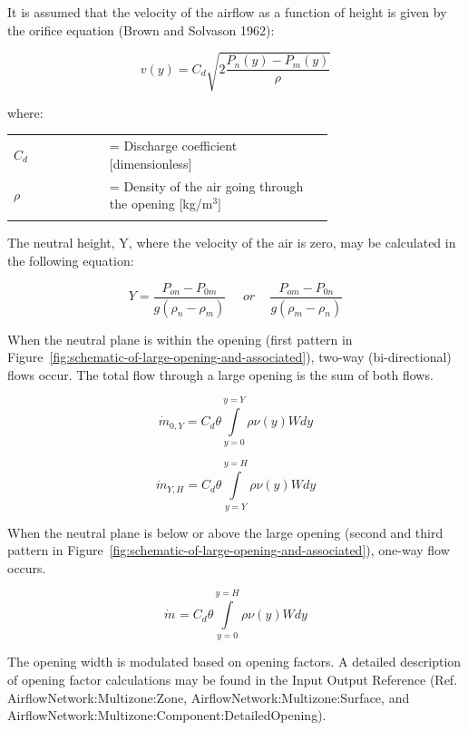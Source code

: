 It is assumed that the velocity of the airflow as a function of height is given by the orifice equation (Brown and Solvason 1962):

\begin{equation}
v(y) = {C_d}\sqrt {2\frac{{{P_n}(y) - {P_m}(y)}}{\rho }}
\end{equation}

where:

\begin{tabular}{lp{0.7\linewidth}}
\\
$C_d$ &= Discharge coefficient [dimensionless] \\
$\rho$ &= Density of the air going through the opening [kg/m\(^{3}\)] \\
\\
\end{tabular}

The neutral height, Y, where the velocity of the air is zero, may be calculated in the following equation:

\begin{equation}
Y = \frac{{{P_{on}} - {P_{0m}}}}{{g({\rho_n} - {\rho_m})}}\,\,\,\,\,\,\,\,or\,\,\,\,\,\,\,\frac{{{P_{om}} - {P_{0n}}}}{{g({\rho_m} - {\rho_n})}}
\end{equation}

When the neutral plane is within the opening (first pattern in Figure~\ref{fig:schematic-of-large-opening-and-associated}), two-way (bi-directional) flows occur. The total flow through a large opening is the sum of both flows.

\begin{equation}
{\dot m_{0,Y}} = {C_d}\theta \int\limits_{y = 0}^{y = Y} {\rho \nu (y)Wdy}
\end{equation}

\begin{equation}
{\dot m_{Y,H}} = {C_d}\theta \int\limits_{y = Y}^{y = H} {\rho \nu (y)Wdy}
\end{equation}

When the neutral plane is below or above the large opening (second and third pattern in Figure~\ref{fig:schematic-of-large-opening-and-associated}), one-way flow occurs.

\begin{equation}
{\dot m_{}} = {C_d}\theta \int\limits_{y = 0}^{y = H} {\rho \nu (y)Wdy}
\end{equation}

The opening width is modulated based on opening factors. A detailed description of opening factor calculations may be found in the Input Output Reference (Ref. AirflowNetwork:Multizone:Zone, AirflowNetwork:Multizone:Surface, and AirflowNetwork:Multizone:Component:DetailedOpening).


